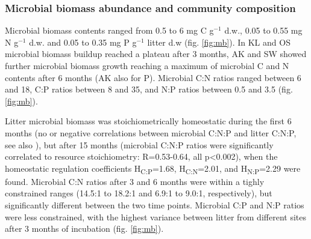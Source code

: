 \subsubsection*{Microbial biomass abundance and community composition}
Microbial biomass contents ranged from 0.5 to 6 mg C g$^{-1}$ d.w., 0.05 to 0.55 mg N g$^{-1}$ d.w. and 0.05 to 0.35 mg P g$^{-1}$ litter d.w (fig. \ref{fig:mb}). In KL and OS microbial biomass buildup reached a plateau after 3 months, AK and SW showed further microbial biomass growth reaching a maximum of microbial C and N contents after 6 months (AK also for P). Microbial C:N ratios ranged between 6 and 18, C:P ratios between 8 and 35, and N:P ratios between 0.5 and 3.5 (fig. \ref{fig:mb}).

Litter microbial biomass was stoichiometrically homeostatic during the first 6 months (no or negative correlations between microbial C:N:P and litter C:N:P, see also \cite{Mooshammer2011}), but after 15 months (microbial C:N:P ratios were significantly correlated to resource stoichiometry: R=0.53-0.64, all p\textless 0.002), when the homeostatic regulation coefficients \cite{Sterner2002} H\textsubscript{C:P}=1.68, H\textsubscript{C:N}=2.01, and H\textsubscript{N:P}=2.29 were found. Microbial C:N ratios after 3 and 6 months were within a tighly constrained ranges (14.5:1 to 18.2:1 and 6.9:1 to 9.0:1, respectively), but significantly different between the two time points. Microbial C:P and N:P ratios were less constrained, with the highest variance between litter from different sites after 3 months of incubation (fig. \ref{fig:mb}).

